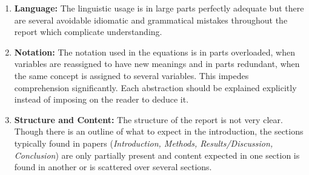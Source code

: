 \documentclass[../review.tex]{subfiles}
\begin{document}
\begin{enumerate}
 \item \textbf{Language:} The linguistic usage is in large parts perfectly adequate but there are several avoidable idiomatic and grammatical mistakes throughout the report which complicate understanding.
 \item \textbf{Notation:} The notation used in the equations is in parts overloaded, when variables are reassigned to have new meanings and in parts redundant, when the same concept is assigned to several variables. This impedes comprehension significantly. Each abstraction should be explained explicitly instead of imposing on the reader to deduce it.
 \item \textbf{Structure and Content:} The structure of the report is not very clear. Though there is an outline of what to expect in the introduction, the sections typically found in papers (\textit{Introduction, Methods, Results/Discussion, Conclusion}) are only partially present and content expected in one section is found in another or is scattered over several sections.
\end{enumerate}
\end{document}
